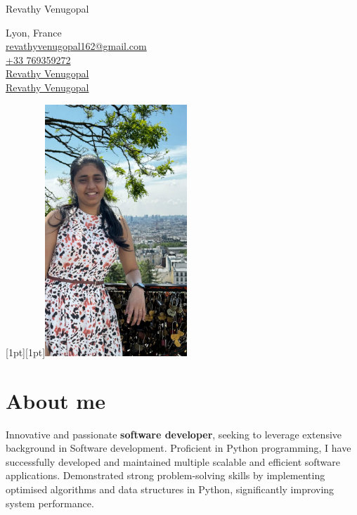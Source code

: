 \documentclass[11pt]{article}
\begin{document}

\begin{flushleft}
    {\fontsize{30}{30}\selectfont Revathy Venugopal} \\ \bigskip
    
    {\color{icnclr}\faMapMarker} {Lyon, France} \\ \bigskip
    {\color{icnclr}\faEnvelope[regular]} \href{mailto:revathyvenugopal162@gmail.com}{revathyvenugopal162@gmail.com} \\ \bigskip
    {\color{icnclr}} \href{tel:+33769359272}{+33 769359272} \\ \bigskip
    {\color{icnclr}\faLinkedinIn} \href{https://www.linkedin.com/in/revathy-venugopal-3310b5147/}{Revathy Venugopal}\\ \bigskip
    {\color{icnclr}\faGithub} \href{https://github.com/Revathyvenugopal162/}{Revathy Venugopal}
\end{flushleft}
\noindent
\hfill
\raisebox{1em}[1pt][1pt]{\includegraphics[width=0.4\textwidth]{revathy.jpeg}} %
\section{About me}
Innovative and passionate \textbf{software developer}, seeking to leverage extensive background in Software development.
Proficient in Python programming, I have successfully developed and maintained multiple scalable and efficient software applications.
Demonstrated strong problem-solving skills by implementing optimised algorithms and data structures in Python, significantly improving system performance.
\end{document}
